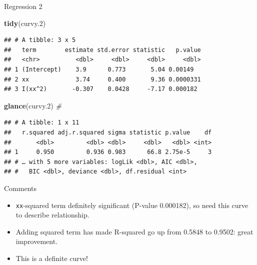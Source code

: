 \documentclass[ignorenonframetext,]{beamer}
\newenvironment{Shaded}{\begin{snugshade}}{\end{snugshade}}
\newcommand{\CommentTok}[1]{\textcolor[rgb]{0.56,0.35,0.01}{\textit{#1}}}
\newcommand{\FloatTok}[1]{\textcolor[rgb]{0.00,0.00,0.81}{#1}}
\newcommand{\KeywordTok}[1]{\textcolor[rgb]{0.13,0.29,0.53}{\textbf{#1}}}
\newcommand{\NormalTok}[1]{#1}
\begin{document}
\begin{frame}[fragile]{Regression 2}
\protect\hypertarget{regression-2}{}

\begin{Shaded}
\begin{Highlighting}[]
\KeywordTok{tidy}\NormalTok{(curvy}\FloatTok{.2}\NormalTok{)}
\end{Highlighting}
\end{Shaded}

\begin{verbatim}
## # A tibble: 3 x 5
##   term        estimate std.error statistic   p.value
##   <chr>          <dbl>     <dbl>     <dbl>     <dbl>
## 1 (Intercept)    3.9      0.773       5.04 0.00149  
## 2 xx             3.74     0.400       9.36 0.0000331
## 3 I(xx^2)       -0.307    0.0428     -7.17 0.000182
\end{verbatim}

\begin{Shaded}
\begin{Highlighting}[]
\KeywordTok{glance}\NormalTok{(curvy}\FloatTok{.2}\NormalTok{) }\CommentTok{#}
\end{Highlighting}
\end{Shaded}

\begin{verbatim}
## # A tibble: 1 x 11
##   r.squared adj.r.squared sigma statistic p.value    df
##       <dbl>         <dbl> <dbl>     <dbl>   <dbl> <int>
## 1     0.950         0.936 0.983      66.8 2.75e-5     3
## # … with 5 more variables: logLik <dbl>, AIC <dbl>,
## #   BIC <dbl>, deviance <dbl>, df.residual <int>
\end{verbatim}

\end{frame}

\begin{frame}[fragile]{Comments}
\protect\hypertarget{comments-1}{}

\begin{itemize}
\item
  \texttt{xx}-squared term definitely significant (P-value 0.000182), so
  need this curve to describe relationship.
\item
  Adding squared term has made R-squared go up from 0.5848 to 0.9502:
  great improvement.
\item
  This is a definite curve!
\end{itemize}

\end{frame}
\end{document}
